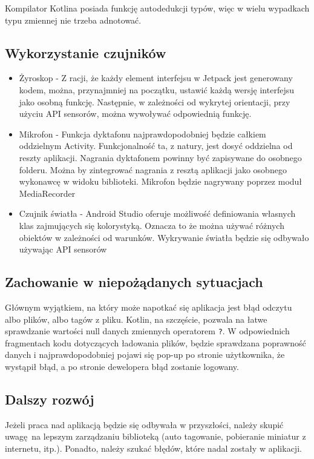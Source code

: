 Kompilator Kotlina posiada funkcję autodedukcji typów, więc w wielu wypadkach typu zmiennej nie trzeba adnotować.

\subsection{Wykorzystanie czujników}

\begin{itemize}
	\item Żyroskop - Z racji, że każdy element interfejsu w Jetpack jest generowany kodem, można, przynajmniej na początku, ustawić każdą wersję interfejsu jako osobną funkcję. Następnie, w zależności od wykrytej orientacji, przy użyciu API sensorów\cite{doc_sensorapi}, można wywoływać odpowiednią funkcję.
	
	\item Mikrofon - Funkcja dyktafonu najprawdopodobniej będzie całkiem oddzielnym Activity. Funkcjonalność ta, z natury, jest dosyć oddzielna od reszty aplikacji. Nagrania dyktafonem powinny być zapisywane do osobnego folderu. Można by zintegrować nagrania z resztą aplikacji jako osobnego wykonawcę w widoku biblioteki. Mikrofon będzie nagrywany poprzez moduł MediaRecorder\cite{doc_mediarecorder}

	\item Czujnik światła - Android Studio oferuje możliwość definiowania własnych klas zajmujących się kolorystyką. Oznacza to że można używać różnych obiektów w zależności od warunków. Wykrywanie światła będzie się odbywało używając API sensorów\cite{doc_sensorapi}
\end{itemize}


\subsection{Zachowanie w niepożądanych sytuacjach}

Głównym wyjątkiem, na który może napotkać się aplikacja jest błąd odczytu albo plików, albo tagów z pliku. Kotlin, na szczęście, pozwala na łatwe sprawdzanie wartości null danych zmiennych operatorem \texttt{?}. W odpowiednich fragmentach kodu dotyczących ładowania plików, będzie sprawdzana poprawność danych i najprawdopodobniej pojawi się pop-up po stronie użytkownika, że wystąpił błąd, a po stronie dewelopera błąd zostanie logowany.

\subsection{Dalszy rozwój}

Jeżeli praca nad aplikacją będzie się odbywała w przyszłości, należy skupić uwagę na lepszym zarządzaniu biblioteką (auto tagowanie, pobieranie miniatur z internetu, itp.). Ponadto, należy szukać błędów, które nadal zostały w aplikacji.
